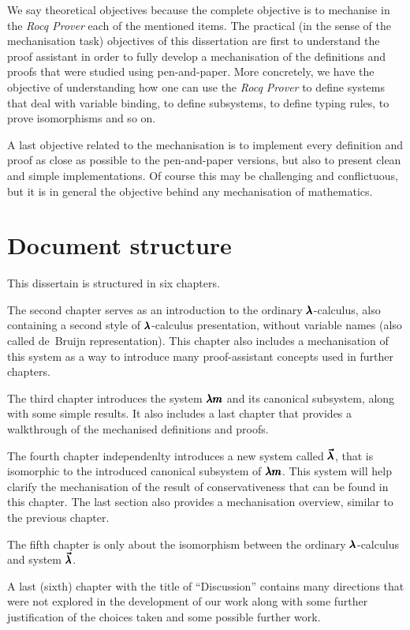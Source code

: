 We say theoretical objectives because the complete objective is to mechanise in the \textit{Rocq Prover} each of the mentioned items.
The practical (in the sense of the mechanisation task) objectives of this dissertation are first to understand the proof assistant in order to fully develop a mechanisation of the definitions and proofs that were studied using pen-and-paper.
More concretely, we have the objective of understanding how one can use the \textit{Rocq Prover} to define systems that deal with variable binding, to define subsystems, to define typing rules, to prove isomorphisms and so on.

A last objective related to the mechanisation is to implement every definition and proof as close as possible to the pen-and-paper versions, but also to present clean and simple implementations.
Of course this may be challenging and conflictuous, but it is in general the objective behind any mechanisation of mathematics. 

\section{Document structure}

This dissertain is structured in six chapters.

The second chapter serves as an introduction to the ordinary $\pmb{\lambda}$-calculus, also containing a second style of $\pmb{\lambda}$-calculus presentation, without variable names (also called de~Bruijn representation).
This chapter also includes a mechanisation of this system as a way to introduce many proof-assistant concepts used in further chapters.

The third chapter introduces the system $\pmb{\lambda m}$ and its canonical subsystem, along with some simple results.
It also includes a last chapter that provides a walkthrough of the mechanised definitions and proofs.

The fourth chapter independenlty introduces a new system called $\pmb{\vec \lambda}$, that is isomorphic to the introduced canonical subsystem of $\pmb{\lambda m}$.
This system will help clarify the mechanisation of the result of conservativeness that can be found in this chapter.
The last section also provides a mechanisation overview, similar to the previous chapter.

The fifth chapter is only about the isomorphism between the ordinary $\pmb{\lambda}$-calculus and system $\pmb{\vec \lambda}$.

A last (sixth) chapter with the title of ``Discussion'' contains many directions that were not explored in the development of our work along with some further justification of the choices taken and some possible further work.


